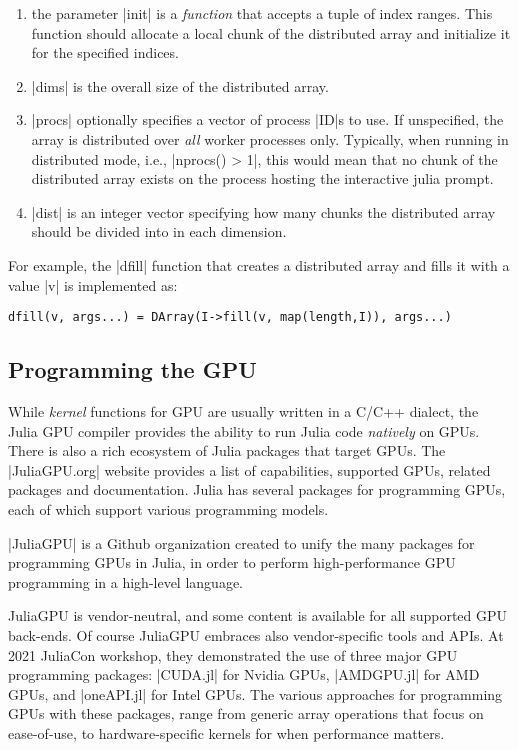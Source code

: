 \begin{enumerate}
\item 
  the parameter |init| is a \emph{function} that accepts a tuple of index ranges. This
  function should allocate a local chunk of the distributed array and
  initialize it for the specified indices.
\item 
  |dims| is the overall size of the distributed array.
\item 
  |procs| optionally specifies a vector of process |ID|s to use. If unspecified,
  the array is distributed over \emph{all} worker processes only. Typically, when running in distributed mode, i.e., |nprocs() > 1|, this would mean that no chunk of the distributed array exists on the process hosting the interactive julia prompt.
\item 
  |dist| is an integer vector specifying how many chunks the distributed array should be divided into in each dimension.
\end{enumerate}



For example, the |dfill| function that creates a distributed array and fills it with a value |v| is implemented as:
\begin{lstlisting}[language=JuliaLocal, style=julia, mathescape=false]
  dfill(v, args...) = DArray(I->fill(v, map(length,I)), args...)
\end{lstlisting}




\subsection{Programming the GPU}
\label{subsec:2:style}

While \emph{kernel} functions for GPU are usually written in a C/C++ dialect, the Julia GPU compiler provides the ability to run Julia code \emph{natively} on GPUs. There is also a rich ecosystem of Julia packages that target GPUs. The |JuliaGPU.org| website provides a list of capabilities, supported GPUs, related packages and documentation.
Julia has several packages for programming GPUs, each of which support various programming models. 

|JuliaGPU| is a Github organization created to unify the many packages for programming GPUs in Julia, in order to perform high-performance GPU programming in a high-level language. 

JuliaGPU is vendor-neutral, and some content is available for all supported GPU back-ends. Of course JuliaGPU embraces also vendor-specific tools and APIs. At 2021 JuliaCon workshop, they demonstrated the use of three major GPU programming packages: |CUDA.jl| for Nvidia GPUs, |AMDGPU.jl| for AMD GPUs, and |oneAPI.jl| for Intel GPUs. 
The various approaches for programming GPUs with these packages, range from generic array operations that focus on ease-of-use, to hardware-specific kernels for when performance matters.

